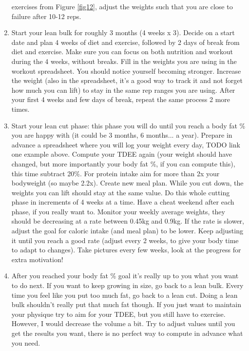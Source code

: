 \documentclass[openany, 12pt]{book}
\begin{document}
\begin{enumerate}
                  exercises from Figure \ref{fig12}, adjust the weights such that you are close to failure after 10-12 reps.
                \item Start your lean bulk for roughly 3 months (4 weeks x 3). Decide on a start date and plan 4 weeks of diet and exercise, followed by 2 days of break from diet and exercise.
                  Make sure you can focus on both nutrition and workout during the 4 weeks, without breaks. 
                  Fill in the weights you are using in the workout spreadsheet. You should notice yourself becoming stronger. Increase the weight (also in the spreadsheet, it's
                  a good way to track it and not forget how much you can lift) to stay in the same rep ranges you are using. After your first 4 weeks and few days of break,
                  repeat the same process 2 more times.
                \item Start your lean cut phase: this phase you will do until you reach a body fat \% you are happy with (it could be 3 months, 6 months... a year). Prepare in advance a spreadsheet
                  where you will log your weight every day, TODO link one example above. Compute your TDEE again (your weight should have changed, but more importantly your body fat \%, if you can
                  compute this), this time subtract 20\%. For protein intake aim
                  for more than 2x your bodyweight (so maybe 2.2x). Create new meal plan. While you cut down, the weights you can lift should stay at the same value. Do this whole cutting phase in
                  increments of 4 weeks at a time. Have a cheat weekend after each phase, if you really want to. Monitor your weekly average weights, they should be decreasing at a rate between
                  0.45kg and 0.9kg. If the rate is slower, adjust the goal for caloric intake (and meal plan) to be lower.
                  Keep adjusting it until you reach a good rate (adjust every 2 weeks, to give your body time to adapt to changes).
                  Take pictures every few weeks, look at the progress for extra motivation!
                \item After you reached your body fat \% goal it's really up to you what you want to do next. If you want to keep growing in size, go back to a lean bulk. Every time you feel like
                  you put too much fat, go back to a lean cut. Doing a lean bulk shouldn't really put that much fat though. If you just want to maintain your physique try to aim for your TDEE, but you
                  still have to exercise. However, I would decrease the volume a bit. Try to adjust values until you get the results you want, there is no perfect way to compute in advance what you need.

\end{enumerate}
\end{document}
